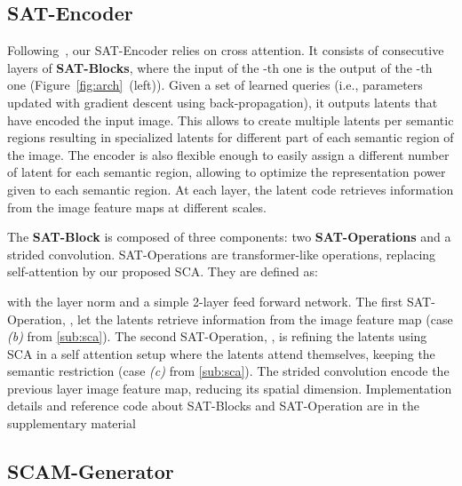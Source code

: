 \documentclass[runningheads]{llncs}
\makeatletter
\newcommand{\ie}{i.e.\@\xspace}
\makeatother
\begin{document}
\subsection{SAT-Encoder}
\label{sub:sat}




Following~\cite{jaegle2021perceiver}, our SAT-Encoder relies on cross attention. 
It consists of  consecutive layers of \textbf{SAT-Blocks}, where the input of the -th one is the output of the -th one 
(Figure~\ref{fig:arch}~(left)). Given a set of learned queries  (\ie, parameters updated with gradient descent using back-propagation), it 
outputs latents  that have encoded the input image. 
This allows to create multiple latents per semantic regions resulting in specialized latents for different part of each semantic region of the image. The encoder is also flexible enough to easily assign a different number of latent for each semantic region, allowing to optimize the representation power given to each semantic region. At each layer, the latent code retrieves information from the image feature maps at different scales.



\noindent The \textbf{SAT-Block} is composed of three components: two \textbf{SAT-Operations} and a strided convolution. SAT-Operations are transformer-like \cite{vaswani2017attention} operations, replacing self-attention by our proposed SCA. They are defined as:

with  the layer norm and  a simple 2-layer feed forward network.
The first SAT-Operation, , let the latents retrieve information from the image feature map (case \emph{(b)} from \ref{sub:sca}). The second SAT-Operation, , is refining the latents using SCA in a self attention setup where the latents attend themselves, keeping the semantic restriction (case \emph{(c)} from \ref{sub:sca}). The strided convolution encode the previous layer image feature map, reducing its spatial dimension. Implementation details and reference code about SAT-Blocks and SAT-Operation are in the supplementary material



 














 
\subsection{SCAM-Generator}
\label{sub:scam}
\end{document}
